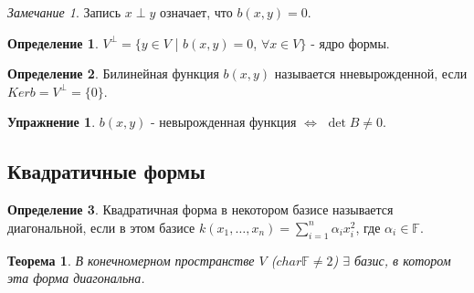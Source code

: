 \documentclass[a4paper, 12pt]{article}
\newcommand{\F}{\mathbb F}
\theoremstyle{definition}
\newtheorem*{definition}{Определение}
\newtheorem*{exercise}{Упражнение}
\theoremstyle{plain}
\newtheorem*{theorem}{Теорема}
\theoremstyle{remark}
\newtheorem*{remark}{Замечание}
\begin{document}
  \begin{remark}
    Запись $x\perp y$ означает, что $b(x,y)=0$.
  \end{remark}
  \begin{definition}
    $V^{\perp}=\{y\in V$ | $b(x,y)=0$, $\forall x\in V\}$ - ядро формы.
  \end{definition}
  \begin{definition}
    Билинейная функция $b(x,y)$ называется нневырожденной, если $Kerb=V^{\perp}=\{0\}$.
  \end{definition}
  \begin{exercise}
    $b(x,y)$ - невырожденная функция $\Longleftrightarrow$ $\det B\neq0$.
  \end{exercise}
  \subsection{Квадратичные формы}
  \begin{definition}
    Квадратичная форма в некотором базисе называется диагональной, если в этом базисе $k(x_1, \ldots, x_n)=\sum\limits_{i=1}^n\alpha_ix_i^2$, где $\alpha_i\in\F$.
  \end{definition}
  \begin{theorem}
    В конечномерном пространстве $V$ ($char\F\neq2$) $\exists$ базис, в котором эта форма диагональна.
  \end{theorem}
\end{document}
